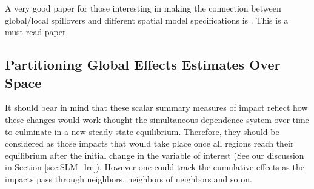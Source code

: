 \documentclass[english,12pt]{book}\usepackage[]{graphicx}\usepackage[]{xcolor}
\begin{document}
\begin{remark}
A very good paper for those interesting in making the connection between global/local spillovers and different spatial model specifications is \cite{lesage2014regional}. This is a must-read paper. 
\end{remark}





\subsection{Partitioning Global Effects Estimates Over Space}\label{sec:partitioning-effects}

It should bear in mind that these scalar summary measures of impact reflect how these changes would work thought the simultaneous dependence system over time to culminate in a new steady state equilibrium. Therefore, they should be considered as those impacts that would take place once all regions reach their equilibrium after the initial change in the variable of interest (See our discussion in Section \ref{sec:SLM_lre}). However one could track the cumulative effects as the impacts pass through neighbors, neighbors of neighbors and so on. 
\end{document}
